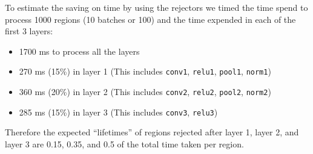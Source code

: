 To estimate the saving on time by using the rejectors we timed the time spend to process 1000 regions (10 batches or 100) and the time expended in each of the first 3 layers:
\begin{itemize}
\item 1700 ms to process all the layers
\item 270 ms (15\%) in layer 1 (This includes \texttt{conv1}, \texttt{relu1}, \texttt{pool1}, \texttt{norm1})
\item 360 ms (20\%) in layer 2 (This includes \texttt{conv2}, \texttt{relu2}, \texttt{pool2}, \texttt{norm2})
\item 285 ms (15\%) in layer 3 (This includes \texttt{conv3}, \texttt{relu3})
\end{itemize}
Therefore the expected ``lifetimes'' of regions rejected after layer 1, layer 2, and layer 3 are  0.15, 0.35, and 0.5 of the total time taken per region.


